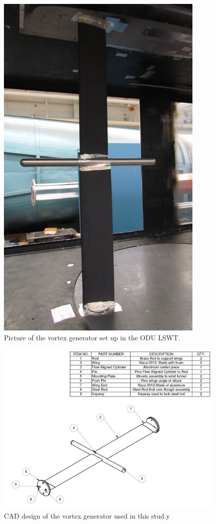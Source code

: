 \begin{figure}[H]
\centering
\includegraphics[width=4in]{figs/setup/vortex_generator/picture}
\caption{Picture of the vortex generator set up in the ODU LSWT.}
\label{fig:vortex_gen}
\end{figure}

\begin{figure}[H]
\centering
\includegraphics[width=6.5in]{figs/setup/vortex_generator/design}
\caption{CAD design of the vortex generator used in this stud.y}
\label{fig:vortex_design}
\end{figure}

